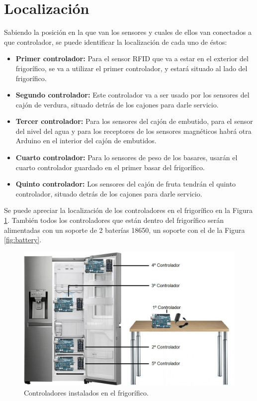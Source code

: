 \section{Localización}

Sabiendo la posición en la que van los sensores y cuales de ellos van conectados a que controlador, se puede identificar la localización de cada uno de éstos:

\begin{itemize}
    \item \textbf{Primer controlador:} Para el sensor RFID que va a estar en el exterior del frigorífico, se va a utilizar el primer controlador, y estará situado al lado del frigorífico.
    \item \textbf{Segundo controlador:} Este controlador va a ser usado por los sensores del cajón de verdura, situado detrás de los cajones para darle servicio.
    \item \textbf{Tercer controlador:} Para los sensores del cajón de embutido, para el sensor del nivel del agua y para los receptores de los sensores magnéticos habrá otra Arduino en el interior del cajón de embutidos.
    \item \textbf{Cuarto controlador:} Para lo sensores de peso de los basares, usarán el cuarto controlador guardado en el primer basar del frigorífico.
    \item \textbf{Quinto controlador:} Los sensores del cajón de fruta tendrán el quinto controlador, situado detrás de los cajones para darle servicio.
\end{itemize}

Se puede apreciar la localización de los controladores en el frigorífico en la Figura \ref{fig:controllerlg}. También todos los controladores que están dentro del frigorífico serán alimentadas con un soporte de 2 baterías 18650, un soporte con el de la Figura \ref{fig:battery}.

\begin{figure}[h] 
    \centering
    \includegraphics[width=.80\textwidth]{capitulos/capitulo6/controladorlg.jpg}
    \caption{Controladores instalados en el frigorífico.}
    \label{fig:controllerlg}
\end{figure}

